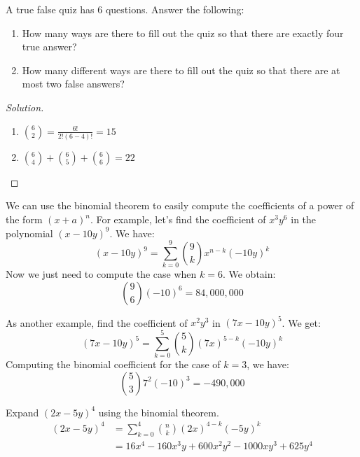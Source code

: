     \begin{problem}
    A true false quiz has $6$ questions. Answer the following:
    \begin{enumerate}
        \item How many ways are there to fill out the quiz so that there are exactly four true answer?
        \item How many different ways are there to fill out the quiz so that there are at most two false answers?
    \end{enumerate}
    \end{problem}
    \begin{proof}[Solution]
        \par
        \begin{enumerate}
            \item $\binom{6}{2} = \frac{6!}{2!(6-4)!}=15$
            \item $\binom{6}{4}+\binom{6}{5}+\binom{6}{6} = 22$
        \end{enumerate}
    \end{proof}
    \begin{example}
        We can use the binomial theorem to easily compute the coefficients of
        a power of the form $(x+a)^{n}$. For example, let's find the coefficient
        of $x^{3}y^{6}$ in the polynomial $(x-10y)^9$.
        We have:
        \begin{equation}
            (x-10y)^{9}=\sum_{k=0}^{9}\binom{9}{k}x^{n-k}(\minus{10}y)^{k}
        \end{equation}
        Now we just need to compute the case when $k=6$. We obtain:
        \begin{equation}
            \binom{9}{6}(\minus{10})^6=84,000,000
        \end{equation}
    \end{example}
    \begin{example}
        As another example, find the coefficient of $x^{2}y^{3}$ in
        $(7x-10y)^{5}$. We get:
        \begin{equation}
            (7x-10y)^{5}=\sum_{k=0}^{5}\binom{5}{k}(7x)^{5-k}(\minus{10}y)^{k}
        \end{equation}
        Computing the binomial coefficient for the case of $k=3$, we have:
        \begin{equation}
            \binom{5}{3}7^{2}(\minus{10})^{3}=\minus{490,000}
        \end{equation}
    \end{example}
    \begin{example}
        Expand $(2x-5y)^4$ using the binomial theorem.
        \begin{subequations}
            \begin{align}
                (2x-5y)^{4}
                &=\sum_{k=0}^{4}\binom{n}{k}(2x)^{4-k}(-5y)^{k}\\
                &=16x^{4}-160x^{3}y+600x^{2}y^{2}-1000xy^{3}+625y^{4}
            \end{align}
        \end{subequations}
    \end{example}
